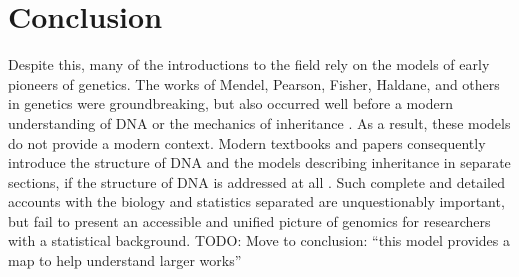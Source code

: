 \documentclass{article}
\newcommand{\TODO}[1]{{\color{brickred} TODO:  {#1}}}
\begin{document}









\section{Conclusion} \label{sec:conclusion}

Despite this, many of the introductions to the field rely on the models of early pioneers of genetics. The works of Mendel, Pearson, Fisher, Haldane, and others in genetics were groundbreaking, but also occurred well before a modern understanding of DNA or the mechanics of inheritance \cite{visschergoddard2019}. As a result, these models do not provide a modern context. Modern textbooks and papers consequently introduce the structure of DNA and the models describing inheritance in separate sections, if the structure of DNA is addressed at all \cite{crowkimura1970intro, siegmundyakir2007, xu2013principles, liu1998statistical}. Such complete and detailed accounts with the biology and statistics separated are unquestionably important, but fail to present an accessible and unified picture of genomics for researchers with a statistical background. \TODO{Move to conclusion: ``this model provides a map to help understand larger works''}
\end{document}
